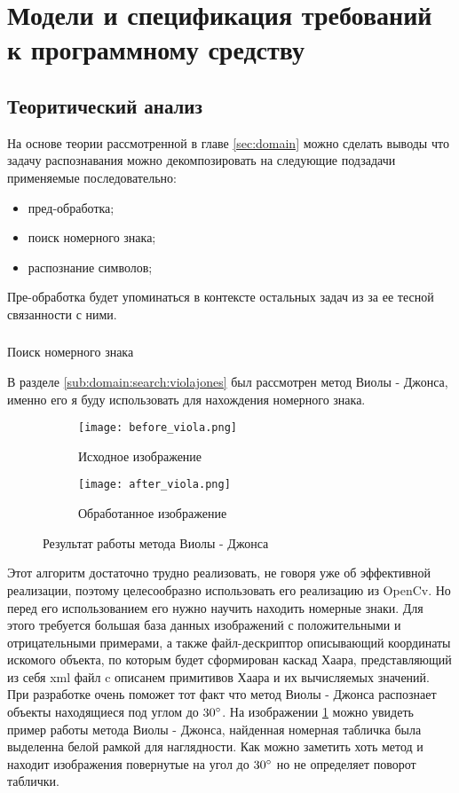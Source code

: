 \section{Модели и спецификация требований к программному средству}
\label{sec:funcreq}

\subsection{Теоритический анализ}

На основе теории рассмотренной в главе \ref{sec:domain} можно сделать выводы что задачу распознавания можно декомпозировать на следующие подзадачи применяемые последовательно:
\begin{itemize}
	\item пред-обработка;
	\item поиск номерного знака;
	\item распознание символов;
\end{itemize} 

Пре-обработка будет упоминаться в контексте остальных задач из за ее тесной связанности с ними.

\subsubsection{}
\label{seq:funcreq:analisys}
Поиск номерного знака

В разделе \ref{sub:domain:search:violajones} был рассмотрен метод Виолы - Джонса, именно его я буду использовать для нахождения номерного знака. 
\begin{figure}[ht]
\centering
  \begin{subfigure}[b]{0.48\textwidth} 
    \centering
    \texttt{[image: before\_viola.png]}  
    \caption{Исходное изображение}
  \end{subfigure}
  \begin{subfigure}[b]{0.48\textwidth} 
    \centering
    \texttt{[image: after\_viola.png]}  
    \caption{Обработанное изображение}
  \end{subfigure}
  \caption{Результат работы метода Виолы - Джонса}
  \label{fig:funcreq:analisys:viola}
\end{figure}
Этот алгоритм достаточно трудно реализовать, не говоря уже об эффективной реализации, поэтому целесообразно использовать его реализацию из OpenCv. Но перед его использованием его нужно научить находить номерные знаки. Для этого требуется большая база данных изображений с положительными и отрицательными примерами, а также файл-дескриптор описывающий координаты искомого объекта, по которым будет сформирован каскад Хаара, представляющий из себя xml файл c описанем примитивов Хаара и их вычисляемых значений. При разработке очень поможет тот факт что метод Виолы - Джонса распознает объекты находящиеся под углом до $30\degree$. На изображении \ref{fig:funcreq:analisys:viola} можно увидеть пример работы метода Виолы - Джонса, найденная номерная табличка была выделенна белой рамкой для наглядности. Как можно заметить хоть метод и находит изображения повернутые на угол до $30\degree$ но не определяет поворот таблички. 


